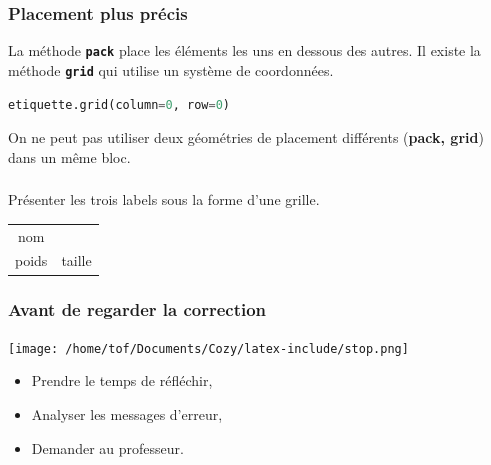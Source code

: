 \documentclass[svgnames,11pt]{beamer}
\begin{document}
\begin{frame}[fragile]
    \frametitle{Placement plus précis}
    La méthode \textbf{\texttt{pack}} place les éléments les uns en dessous des autres. Il existe la méthode \textbf{\texttt{grid}} qui utilise un système de coordonnées.
    \begin{center}
        \begin{lstlisting}[language=Python , basicstyle=\ttfamily\small, xleftmargin=1em, xrightmargin=1em]
etiquette.grid(column=0, row=0)
\end{lstlisting}
        \label{CODE}
    \end{center}
    \begin{aretenir}[Commentaire]
        On ne peut pas utiliser deux géométries de placement différents (\textbf{pack, grid}) dans un même bloc.

    \end{aretenir}


\end{frame}
\begin{frame}
    \frametitle{}
    \begin{activite}
        Présenter les trois labels sous la forme d'une grille.
        \begin{center}
            \begin{tabular}{cc}
                nom   &        \\
                poids & taille \\
            \end{tabular}
        \end{center}
    \end{activite}


\end{frame}
\begin{frame}
    \frametitle{Avant de regarder la correction}
\begin{center}
    \centering
    \texttt{[image: /home/tof/Documents/Cozy/latex-include/stop.png]}
    \end{center}
{\Large
    \begin{itemize}
        \item Prendre le temps de réfléchir,
        \item Analyser les messages d'erreur,
        \item Demander au professeur.
    \end{itemize}
}
\end{frame}
\end{document}
